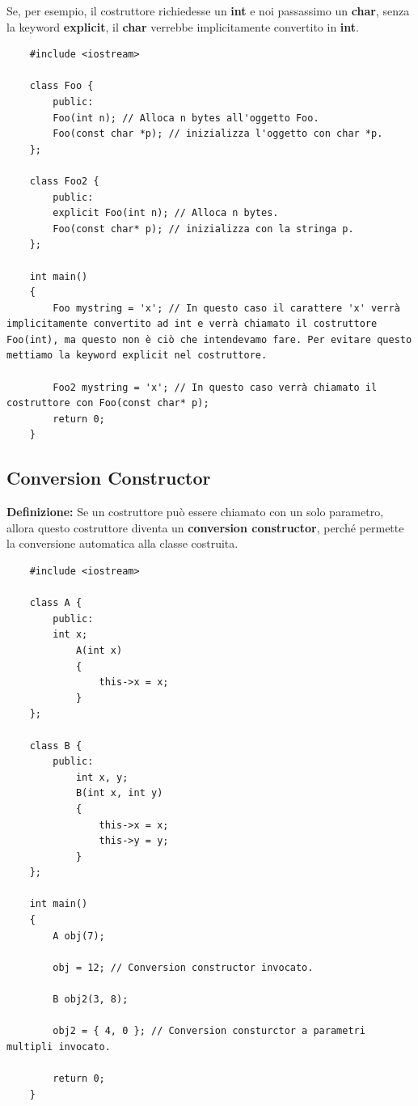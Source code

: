 \textsf{\small Se, per esempio, il costruttore richiedesse un \textbf{int} e noi passassimo un \textbf{char}, senza la keyword \textbf{explicit}, il \textbf{char} verrebbe implicitamente convertito in \textbf{int}.} \\

\begin{lstlisting}
	#include <iostream>
	
	class Foo {
		public:
		Foo(int n); // Alloca n bytes all'oggetto Foo.
		Foo(const char *p); // inizializza l'oggetto con char *p.
	};
	
	class Foo2 {
		public:
		explicit Foo(int n); // Alloca n bytes.
		Foo(const char* p); // inizializza con la stringa p.
	};
	
	int main()
	{
		Foo mystring = 'x'; // In questo caso il carattere 'x' verrà implicitamente convertito ad int e verrà chiamato il costruttore Foo(int), ma questo non è ciò che intendevamo fare. Per evitare questo mettiamo la keyword explicit nel costruttore.
		
		Foo2 mystring = 'x'; // In questo caso verrà chiamato il costruttore con Foo(const char* p);
		return 0;
	}
\end{lstlisting}

\subsection{Conversion Constructor}

\textsf{\small \textbf{Definizione: } Se un costruttore può essere chiamato con un solo parametro, allora questo costruttore diventa un \textbf{conversion constructor}, perché permette la conversione automatica alla classe costruita.} \\

\begin{lstlisting}
	#include <iostream>
	
	class A {
		public:
		int x;
			A(int x)
			{
				this->x = x;	
			}
	};

	class B {
		public:
			int x, y;
			B(int x, int y)
			{
				this->x = x;
				this->y = y;
			}
	};

	int main()
	{
		A obj(7);
		
		obj = 12; // Conversion constructor invocato.
		
		B obj2(3, 8);
		
		obj2 = { 4, 0 }; // Conversion consturctor a parametri multipli invocato.
		
		return 0;
	}	
\end{lstlisting}

